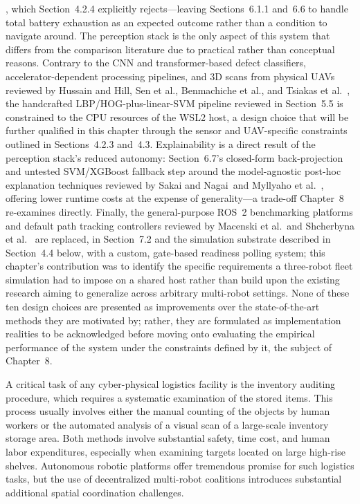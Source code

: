 \cite{notomista2022resilient,djenadi2022energyaware}, which Section~4.2.4 explicitly rejects---leaving Sections~6.1.1 and~6.6 to handle total battery exhaustion as an expected outcome rather than a condition to navigate around. The perception stack is the only aspect of this system that differs from the comparison literature due to practical rather than conceptual reasons. Contrary to the CNN and transformer-based defect classifiers, accelerator-dependent processing pipelines, and 3D scans from physical UAVs reviewed by Hussain and Hill, Sen et al., Benmachiche et al., and Tsiakas et al.\ \cite{hussain2023custom,sen2025feature,benmachiche2026realtime,tsiakas2024autonomous}, the handcrafted LBP/HOG-plus-linear-SVM pipeline reviewed in Section~5.5 is constrained to the CPU resources of the WSL2 host, a design choice that will be further qualified in this chapter through the sensor and UAV-specific constraints outlined in Sections~4.2.3 and~4.3. Explainability is a direct result of the perception stack's reduced autonomy: Section~6.7's closed-form back-projection and untested SVM/XGBoost fallback step around the model-agnostic post-hoc explanation techniques reviewed by Sakai and Nagai\ and Myllyaho et al.\ \cite{sakai2022explainable,myllyaho2022misbehaviour}, offering lower runtime costs at the expense of generality---a trade-off Chapter~8 re-examines directly. Finally, the general-purpose ROS~2 benchmarking platforms and default path tracking controllers reviewed by Macenski et al.\ and Shcherbyna et al.\ \cite{macenski2023fromdesks,shcherbyna2024arena,macenski2023regulated} are replaced, in Section~7.2 and the simulation substrate described in Section~4.4 below, with a custom, gate-based readiness polling system; this chapter's contribution was to identify the specific requirements a three-robot fleet simulation had to impose on a shared host rather than build upon the existing research aiming to generalize across arbitrary multi-robot settings. None of these ten design choices are presented as improvements over the state-of-the-art methods they are motivated by; rather, they are formulated as implementation realities to be acknowledged before moving onto evaluating the empirical performance of the system under the constraints defined by it, the subject of Chapter~8.

A critical task of any cyber-physical logistics facility is the inventory auditing procedure, which requires a systematic examination of the stored items. This process usually involves either the manual counting of the objects by human workers or the automated analysis of a visual scan of a large-scale inventory storage area. Both methods involve substantial safety, time cost, and human labor expenditures, especially when examining targets located on large high-rise shelves. Autonomous robotic platforms offer tremendous promise for such logistics tasks, but the use of decentralized multi-robot coalitions introduces substantial additional spatial coordination challenges.

